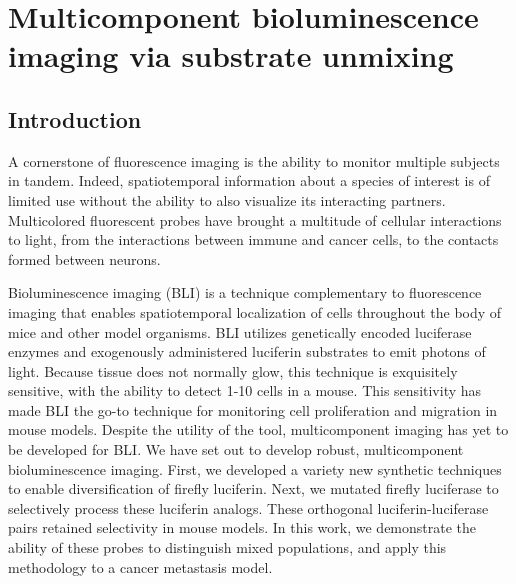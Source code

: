 
\chapter{Multicomponent bioluminescence imaging via substrate unmixing}
\section{Introduction}
A cornerstone of fluorescence imaging is the ability to monitor multiple subjects in tandem.\cite{RodriguezGrowingGlowingToolbox2017}
Indeed, spatiotemporal information about a species of interest is of limited use without the ability to also visualize its interacting partners. Multicolored fluorescent probes have brought a multitude of cellular interactions to light, from the interactions between immune and cancer cells\cite{GermainDecadeImagingCellular2012}, to the contacts formed between neurons.\cite{ChoiInterregionalsynapticmaps2018}

Bioluminescence imaging (BLI) is a technique complementary to fluorescence imaging that enables spatiotemporal localization of cells throughout the body of mice and other model organisms. BLI utilizes genetically encoded luciferase enzymes and exogenously administered luciferin substrates to emit photons of light. Because tissue does not normally glow, this technique is exquisitely sensitive, with the ability to detect 1-10 cells in a mouse.
This sensitivity has made BLI the go-to technique for monitoring cell proliferation and migration in mouse models.\cite{PaleyBioluminescenceversatiletechnique2014}
Despite the utility of the tool, multicomponent imaging has yet to be developed for BLI. We have set out to develop robust, multicomponent bioluminescence imaging.
First, we developed a variety new synthetic techniques to enable diversification of firefly luciferin.\cite{McCutcheonRapidscalableassembly2015,McCutcheonExpedientsynthesiselectronically2012,SteinhardtDesignSynthesisAlkynyl2016,SteinhardtBrominatedLuciferinsAre2016,JonesOrthogonalLuciferaseLuciferinPairs2017}
Next, we mutated firefly luciferase to selectively process these luciferin analogs.\cite{JonesOrthogonalLuciferaseLuciferinPairs2017,RathbunParallelScreeningRapid2017}
These orthogonal luciferin-luciferase pairs retained selectivity in mouse models.\cite{RathbunParallelScreeningRapid2017} In this work, we demonstrate the ability of these probes to distinguish mixed populations, and apply this methodology to a cancer metastasis model.

